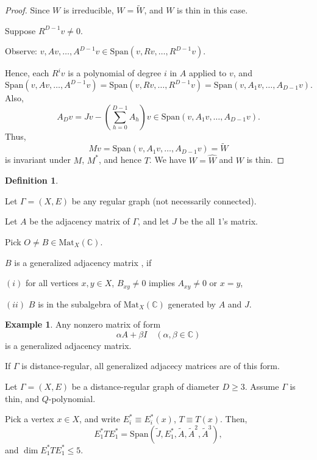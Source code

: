 \documentclass[
]{book}
\theoremstyle{definition}
\newtheorem{definition}{Definition}[chapter]
\theoremstyle{definition}
\newtheorem{example}{Example}[chapter]
\theoremstyle{definition}
\theoremstyle{definition}
\theoremstyle{remark}
\begin{document}
\begin{proof}
Since \(W\) is irreducible, \(W = \widetilde{W}\), and \(W\) is thin in this case.

Suppose \(R^{D-1}v \neq 0\).

Observe: \(v, Av, \ldots, A^{D-1}v \in \mathrm{Span}(v, Rv, \ldots, R^{D-1}v)\).

Hence, each \(R^iv\) is a polynomial of degree \(i\) in \(A\) applied to \(v\), and
\[\mathrm{Span}(v, Av, \ldots, A^{D-1}v) = \mathrm{Span}(v, Rv, \ldots, R^{D-1}v) = \mathrm{Span}(v, A_1v, \ldots, A_{D-1}v).\]
Also,
\[A_Dv = Jv - \left(\sum_{h=0}^{D-1}A_h\right)v \in \mathrm{Span}(v, A_1v, \ldots, A_{D-1}v).\]
Thus,
\[Mv = \mathrm{Span}(v, A_1v, \ldots, A_{D-1}v) = \widetilde{W}\]
is invariant under \(M\), \(M^*\), and hence \(T\). We have \(W = \widehat{W}\) and \(W\) is thin.
\end{proof}

\begin{definition}
\protect\hypertarget{def:generalized-adjacency-matrix}{}\label{def:generalized-adjacency-matrix}

Let \(\Gamma = (X,E)\) be any regular graph (not necessarily connected).

Let \(A\) be the adjacency matrix of \(\Gamma\), and let \(J\) be the all \(1\)'s matrix.

Pick \(O\neq B \in \mathrm{Mat}_X(\mathbb{C})\).

\(B\) is a generalized adjacency matrix , if

\((i)\) for all vertices \(x,y\in X\), \(B_{xy}\neq 0\) implies \(A_{xy}\neq 0\) or \(x = y\),

\((ii)\) \(B\) is in the subalgebra of \(\mathrm{Mat}_X(\mathbb{C})\) generated by \(A\) and \(J\).

\end{definition}

\begin{example}
\protect\hypertarget{exm:generalized-adjacecy-matrix}{}\label{exm:generalized-adjacecy-matrix}Any nonzero matrix of form
\[\alpha A + \beta I \quad (\alpha, \beta\in \mathbb{C})\]
is a generalized adjacency matrix.

If \(\Gamma\) is distance-regular, all generalized adjacecy matrices are of this form.
\end{example}

Let \(\Gamma = (X, E)\) be a distance-regular graph of diameter \(D\geq 3\). Assume \(\Gamma\) is thin, and \(Q\)-polynomial.

Pick a vertex \(x\in X\), and write \(E^*_i \equiv E^*_i(x)\), \(T\equiv T(x)\). Then,
\[E^*_1TE^*_1 = \mathrm{Span}(\tilde{J}, E^*_1, \tilde{A}, \tilde{A}^2, \tilde{A}^3),\]
and \(\dim E^*_1TE^*_1\leq 5\).
\end{document}
